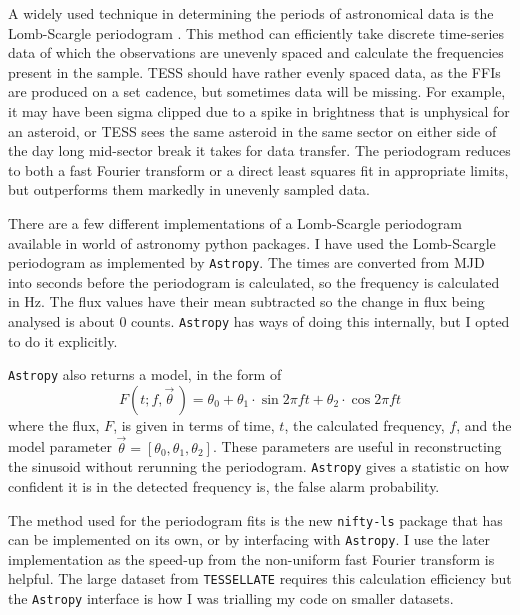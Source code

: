 \documentclass{UCreport}
\begin{document}
A widely used technique in determining the periods of astronomical data is the Lomb-Scargle periodogram \citep[\citet{Lomb1976,Scargle1982}, but see][for a review]{VanderPlas2018}.
This method can efficiently take discrete time-series data of which the observations are unevenly spaced and calculate the frequencies present in the sample.
TESS should have rather evenly spaced data, as the FFIs are produced on a set cadence, but sometimes data will be missing.
For example, it may have been sigma clipped due to a spike in brightness that is unphysical for an asteroid, or TESS sees the same asteroid in the same sector on either side of the day long mid-sector break it takes for data transfer.
The periodogram reduces to both a fast Fourier transform or a direct least squares fit in appropriate limits, but outperforms them markedly in unevenly sampled data.

There are a few different implementations of a Lomb-Scargle periodogram available in world of astronomy python packages.
I have used the Lomb-Scargle periodogram as implemented by \texttt{Astropy}\citep[\citet{Astropy2022} but see][for the implementation]{Vanderplas2012,Vanderplas2015}.
The times are converted from MJD into seconds before the periodogram is calculated, so the frequency is calculated in \unit{\hertz}. 
The flux values have their mean subtracted so the change in flux being analysed is about 0 counts.
\texttt{Astropy} has ways of doing this internally, but I opted to do it explicitly.  

\texttt{Astropy} also returns a model, in the form of
\begin{equation}
  \label{Eq:LCModel}
  F(t;f,\vec{\theta}\,) = \theta_0 + \theta_1\cdot\sin{2\pi ft} +\theta_2\cdot\cos{2\pi ft}
\end{equation}
where the flux, $F$, is given in terms of time, $t$, the calculated frequency, $f$, and the model parameter $\vec{\theta} = [\theta_0, \theta_1,\theta_2]$.
These parameters are useful in reconstructing the sinusoid without rerunning the periodogram.
\texttt{Astropy} gives a statistic on how confident it is in the detected frequency is, the false alarm probability.

The method used for the periodogram fits is the new \texttt{nifty-ls} package \citep{Garrison2024} that has can be implemented on its own, or by interfacing with \texttt{Astropy}.
I use the later implementation as the speed-up from the non-uniform fast Fourier transform is helpful.
The large dataset from \texttt{TESSELLATE} requires this calculation efficiency but the \texttt{Astropy} interface is how I was trialling my code on smaller datasets.
\end{document}
